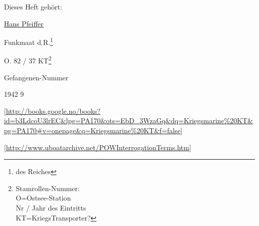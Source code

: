 
\begin{center}
Dieses Heft geh\"{o}rt:

\ul{\ul{Hans Pfeiffer}}


Funkmaat d.R.\footnote{des Reiches}


O. 82 / 37 KT\footnote{Stamrollen-Nummer: \\O=Ostsee-Station \\ Nr / Jahr des Eintritts \\ KT=KriegsTransporter? }


Gefangenen-Nummer

1942 9

\end{center}

{\color{red} [\url{http://books.google.no/books?id=b3LdcoU3lrEC&lpg=PA170&ots=EbD_3WzaGq&dq=Kriegsmarine%20KT&pg=PA170#v=onepage&q=Kriegsmarine%20KT&f=false}] }

{\color{red} [\url{http://www.uboatarchive.net/POWInterrogationTerms.htm}] }

\clearpage
